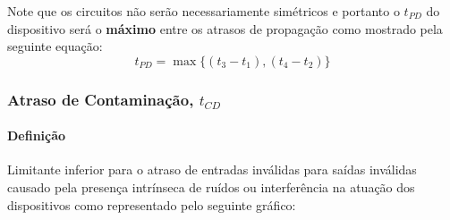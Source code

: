\documentclass{article}
\begin{document}
            Note que os circuitos não serão necessariamente simétricos e portanto o $t_{PD}$ do dispositivo será o \textbf{máximo} entre os atrasos de propagação como mostrado pela seguinte equação:
                \begin{equation}
                    \boxed{
                        t_{PD} = \max\{ (t_{3} - t_{1}), (t_{4} - t_{2}) \}
                    }
                \end{equation}

        \subsubsection{Atraso de Contaminação, $t_{CD}$}
            \paragraph{Definição}Limitante inferior para o atraso de entradas inválidas para saídas inválidas causado pela presença intrínseca de ruídos ou interferência na atuação dos dispositivos como representado pelo seguinte gráfico:
\end{document}
